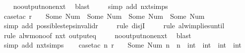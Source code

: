 \begin{isabellebody}
\ \ \isamarkupfalse%
\ no{\isacharunderscore}output{\isacharunderscore}none{\isacharunderscore}nxt\ \isamarkupfalse%
\ blast\isanewline
\ \ \ \isamarkupfalse%
\ {\isacharparenleft}simp\ add{\isacharcolon}\ nxt{\isachardot}simps{\isacharparenright}\isanewline
\ \ \isamarkupfalse%
\ {\isacharparenleft}case{\isacharunderscore}tac\ {\isachardoublequoteopen}r\ {\isachardollar}\ {}\ {\isasymnotin}\ {\isacharbraceleft}Some\ {\isacharparenleft}Num\ {}{\isacharparenright}{\isacharcomma}\ Some\ {\isacharparenleft}Num\ {}{\isacharparenright}{\isacharcomma}\ Some\ {\isacharparenleft}Num\ {}{\isacharparenright}{\isacharcomma}\ Some\ {\isacharparenleft}Num\ {}{\isacharparenright}{\isacharbraceright}{\isachardoublequoteclose}{\isacharparenright}\isanewline
\ \ \ \isamarkupfalse%
\ {\isacharparenleft}simp\ add{\isacharcolon}\ possible{\isacharunderscore}steps{\isacharunderscore}{}{\isacharunderscore}invalid{\isacharunderscore}r{}{\isacharparenright}\isanewline
\ \ \ \isamarkupfalse%
\ {\isacharparenleft}rule\ disjI{}{\isacharparenright}\isanewline
\ \ \ \isamarkupfalse%
\ {\isacharparenleft}rule\ alw{\isacharunderscore}implies{\isacharunderscore}until{\isacharparenright}\isanewline
\ \ \ \isamarkupfalse%
\ {\isacharparenleft}rule\ alw{\isacharunderscore}mono{\isacharbrackleft}of\ {\isachardoublequoteopen}nxt\ {\isacharparenleft}output{\isacharunderscore}eq\ {\isacharbrackleft}{\isacharbrackright}{\isacharparenright}{\isachardoublequoteclose}{\isacharbrackright}{\isacharparenright}\isanewline
\ \ \isamarkupfalse%
\ no{\isacharunderscore}output{\isacharunderscore}none{\isacharunderscore}nxt\ \isamarkupfalse%
\ blast\isanewline
\ \ \ \isamarkupfalse%
\ {\isacharparenleft}simp\ add{\isacharcolon}\ nxt{\isachardot}simps{\isacharparenright}\isanewline
\ \ \isamarkupfalse%
\ {\isacharparenleft}case{\isacharunderscore}tac\ {\isachardoublequoteopen}{\isasymexists}n{\isachardot}\ r\ {\isachardollar}\ {}\ {\isacharequal}\ Some\ {\isacharparenleft}Num\ n{\isacharparenright}\ {\isasymand}\ n\ {\isasymin}\ {\isacharbraceleft}int\ {}{\isacharcomma}\ int\ {}{\isacharcomma}\ int\ {}{\isacharcomma}\ int\ {}{\isacharbraceright}{\isachardoublequoteclose}{\isacharparenright}\isanewline
\ \ \ \isamarkupfalse%

\end{isabellebody}
